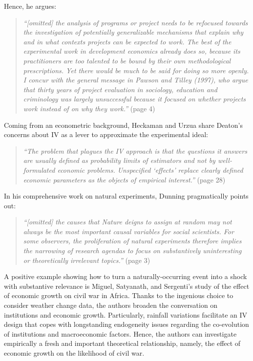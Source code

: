 \begin{refsection}
Hence, he argues:

\begin{quote}
   \textit{
  ``[omitted] the analysis of programs or project needs to be refocused towards
  the investigation of potentially generalizable mechanisms that explain why and
  in what contexts projects can be expected to work. The best of the
  experimental work in development economics already does so, because its
  practitioners are too talented to be bound by their own methodological
  prescriptions. Yet there would be much to be said for doing so more openly. I
  concur with the general message in Pawson and Tilley (1997), who argue that
  thirty years of project evaluation in sociology, education and criminology was
  largely unsuccessful because it focused on whether projects work instead of on
  why they work.''
  }
  (page 4)
\end{quote}

Coming from an econometric background, Heckaman and Urzua
\parencite*{heckman_urzua_2010} share Deaton's concerns about IV as a lever to
approximate the experimental ideal:

\begin{quote}
  \textit{
  ``The problem that plagues the IV approach is that the questions it answers are
  usually defined as probability limits of estimators and not by well-formulated
  economic problems. Unspecified `effects' replace clearly defined economic
  parameters as the objects of empirical interest.''
  }
  (page 28)
\end{quote}

In his comprehensive work on natural experiments, Dunning 
\parencite*{dunning_2012} pragmatically points out:

\begin{quote}
  \textit{
  ``[omitted] the causes that Nature deigns to assign at random may not always be
  the most important causal variables for social scientists. For some observers,
  the proliferation of natural experiments therefore implies the narrowing of
  research agendas to focus on substantively uninteresting or theoretically
  irrelevant topics.''
  }
  (page 3)
\end{quote}

A positive example showing how to turn a naturally-occurring event into a shock
with substantive relevance is Miguel, Satyanath, and Sergenti's
\parencite*{miguel_et_al_2004} study of the effect of economic growth on civil
war in Africa. Thanks to the ingenious choice to consider weather change data,
the authors broaden the conversation on institutions and economic growth.
Particularly, rainfall variations facilitate an IV design that copes with
longstanding endogeneity issues regarding the co-evolution of institutions and
macroeconomic factors. Hence, the authors can investigate empirically a fresh
and important theoretical relationship, namely, the effect of economic growth on
the likelihood of civil war. 


\end{refsection}
